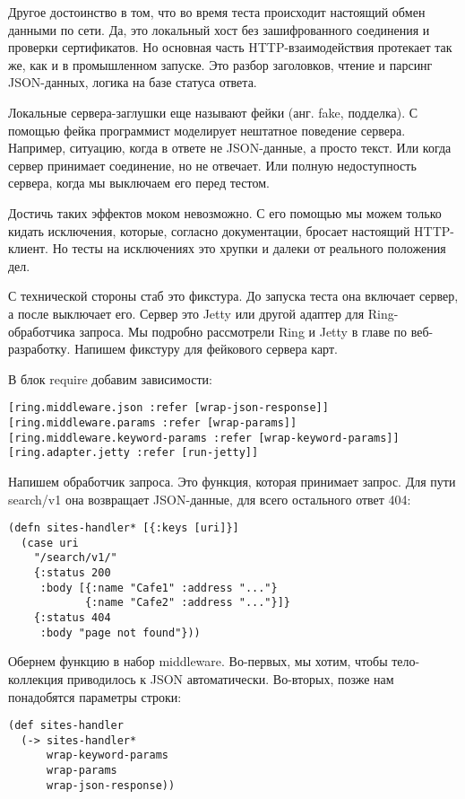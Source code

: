 Другое достоинство в том, что во время теста происходит настоящий обмен данными
по сети. Да, это локальный хост без зашифрованного соединения и проверки
сертификатов. Но основная часть HTTP-взаимодействия протекает так же, как и в
промышленном запуске. Это разбор заголовков, чтение и парсинг JSON-данных,
логика на базе статуса ответа.

Локальные сервера-заглушки еще называют фейки (анг. fake, подделка). С помощью
фейка программист моделирует нештатное поведение сервера. Например, ситуацию,
когда в ответе не JSON-данные, а просто текст. Или когда сервер принимает
соединение, но не отвечает. Или полную недоступность сервера, когда мы выключаем
его перед тестом.

Достичь таких эффектов моком невозможно. С его помощью мы можем только кидать
исключения, которые, согласно документации, бросает настоящий HTTP-клиент. Но
тесты на исключениях это хрупки и далеки от реального положения дел.

С технической стороны стаб это фикстура. До запуска теста она включает сервер, а
после выключает его. Сервер это Jetty или другой адаптер для Ring-обработчика
запроса. Мы подробно рассмотрели Ring и Jetty в главе по веб-разработку. Напишем
фикстуру для фейкового сервера карт.

В блок require добавим зависимости:

\begin{verbatim}
[ring.middleware.json :refer [wrap-json-response]]
[ring.middleware.params :refer [wrap-params]]
[ring.middleware.keyword-params :refer [wrap-keyword-params]]
[ring.adapter.jetty :refer [run-jetty]]
\end{verbatim}

Напишем обработчик запроса. Это функция, которая принимает запрос. Для пути
search/v1 она возвращает JSON-данные, для всего остального ответ 404:

\begin{verbatim}
(defn sites-handler* [{:keys [uri]}]
  (case uri
    "/search/v1/"
    {:status 200
     :body [{:name "Cafe1" :address "..."}
            {:name "Cafe2" :address "..."}]}
    {:status 404
     :body "page not found"}))
\end{verbatim}

Обернем функцию в набор middleware. Во-первых, мы хотим, чтобы тело-коллекция
приводилось к JSON автоматически. Во-вторых, позже нам понадобятся параметры
строки:

\begin{verbatim}
(def sites-handler
  (-> sites-handler*
      wrap-keyword-params
      wrap-params
      wrap-json-response))
\end{verbatim}


